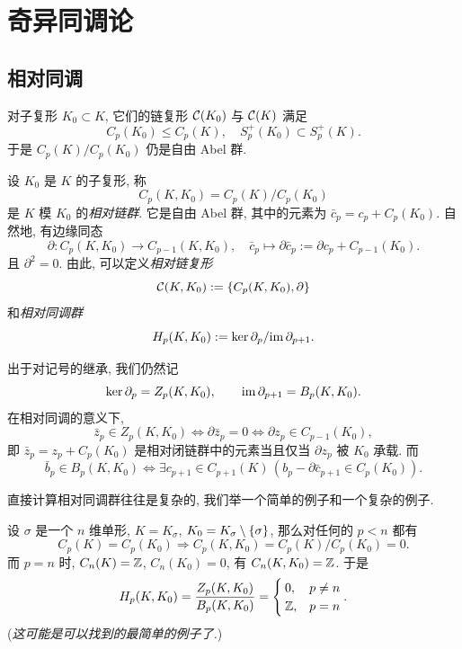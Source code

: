 
\section{奇异同调论}

\subsection{相对同调}

对子复形 $ K_0\subset K $, 它们的链复形 $ \mathcal{C}(K_0) $ 与 $ \mathcal{C}(K) $ 满足
\[
	C_p(K_0)\leqslant C_p(K),\quad S_p^+(K_0)\subset S_p^+(K).
\]
于是 $ C_p(K)/C_p(K_0) $ 仍是自由 Abel 群.

\begin{Definition}
	设 $ K_0 $ 是 $ K $ 的子复形, 称
	\[
		C_p(K,K_0)=C_p(K)/C_p(K_0)
	\]
	是 $ K $ 模 $ K_0 $ 的\emph{相对链群}. 它是自由 Abel 群, 其中的元素为 $ \bar{c}_p=c_p+C_p(K_0) $. 自然地, 有边缘同态
	\[
		\partial : C_p(K,K_0)\to C_{p-1}(K,K_0),\quad \bar{c}_p\mapsto\partial\bar{c}_p:=\partial c_p+C_{p-1}(K_0).
	\]
	且 $ \partial^2=0 $. 由此, 可以定义\emph{相对链复形}
	\[
		\mathcal{C}(K,K_0):=\left\{ C_p(K,K_0),\partial \right\}
	\]
	和\emph{相对同调群}
	\[
		H_p(K,K_0):=\ker\partial_p/\mathrm{im}\,\partial_{p+1}.
	\]
\end{Definition}

出于对记号的继承, 我们仍然记
\[
	\ker\partial_p=Z_p(K,K_0),\qquad \mathrm{im}\,\partial_{p+1}=B_p(K,K_0).
\]
在相对同调的意义下,
\[
	\bar{z}_p\in Z_p(K,K_0)\Longleftrightarrow \partial\bar{z}_p=0\Longleftrightarrow\partial z_p\in C_{p-1}(K_0),
\]
即 $ \bar{z}_p=z_p+C_p(K_0) $ 是相对闭链群中的元素当且仅当 $ \partial z_p $ 被 $ K_0 $ 承载. 而
\[
	\bar{b}_p\in B_p(K,K_0)\Longleftrightarrow\exists c_{p+1}\in C_{p+1}(K)\,(b_p-\partial\bar{c}_{p+1}\in C_p(K_0)).
\]

直接计算相对同调群往往是复杂的, 我们举一个简单的例子和一个复杂的例子.

\begin{Example}
	设 $ \sigma $ 是一个 $ n $ 维单形, $ K=K_\sigma $, $ K_0=K_\sigma\setminus\left\{ \sigma \right\} $, 那么对任何的 $ p<n $ 都有
	\[
		C_p(K)=C_p(K_0)\Longrightarrow C_p(K,K_0)=C_p(K)/C_p(K_0)=0.
	\]
	而 $ p=n $ 时, $ C_n(K)=\mathbb{Z} $, $ C_n(K_0)=0 $, 有 $ C_n(K,K_0)=\mathbb{Z} $. 于是
	\[
		H_p(K,K_0)=\frac{Z_p(K,K_0)}{B_p(K,K_0)}=\begin{cases}
			0, &p\ne n\\ \mathbb{Z}, &p=n
		\end{cases}.
	\]
	(\textit{这可能是可以找到的最简单的例子了.})
\end{Example}

